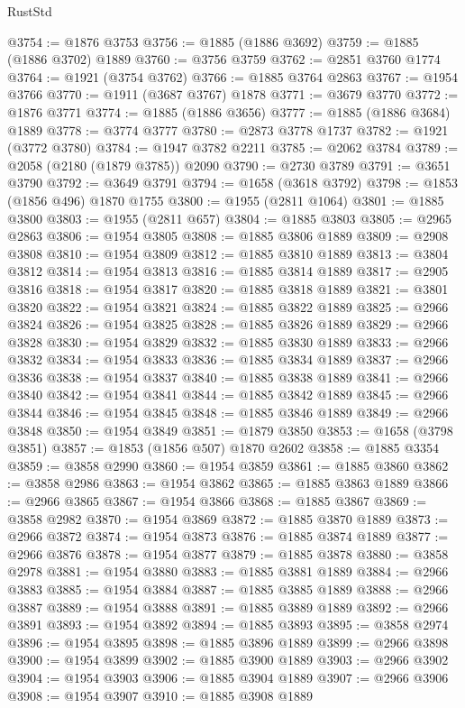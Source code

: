 \begin{lexlean}{RustStd}
\begin{coremodule}
@3754 := @1876 @3753
@3756 := @1885 (@1886 @3692)
@3759 := @1885 (@1886 @3702) @1889
@3760 := @3756 @3759
@3762 := @2851 @3760 @1774
@3764 := @1921 (@3754 @3762)
@3766 := @1885 @3764 @2863
@3767 := @1954 @3766
@3770 := @1911 (@3687 @3767) @1878
@3771 := @3679 @3770
@3772 := @1876 @3771
@3774 := @1885 (@1886 @3656)
@3777 := @1885 (@1886 @3684) @1889
@3778 := @3774 @3777
@3780 := @2873 @3778 @1737
@3782 := @1921 (@3772 @3780)
@3784 := @1947 @3782 @2211
@3785 := @2062 @3784
@3789 := @2058 (@2180 (@1879 @3785)) @2090
@3790 := @2730 @3789
@3791 := @3651 @3790
@3792 := @3649 @3791
@3794 := @1658 (@3618 @3792)
@3798 := @1853 (@1856 @496) @1870 @1755
@3800 := @1955 (@2811 @1064)
@3801 := @1885 @3800
@3803 := @1955 (@2811 @657)
@3804 := @1885 @3803
@3805 := @2965 @2863
@3806 := @1954 @3805
@3808 := @1885 @3806 @1889
@3809 := @2908 @3808
@3810 := @1954 @3809
@3812 := @1885 @3810 @1889
@3813 := @3804 @3812
@3814 := @1954 @3813
@3816 := @1885 @3814 @1889
@3817 := @2905 @3816
@3818 := @1954 @3817
@3820 := @1885 @3818 @1889
@3821 := @3801 @3820
@3822 := @1954 @3821
@3824 := @1885 @3822 @1889
@3825 := @2966 @3824
@3826 := @1954 @3825
@3828 := @1885 @3826 @1889
@3829 := @2966 @3828
@3830 := @1954 @3829
@3832 := @1885 @3830 @1889
@3833 := @2966 @3832
@3834 := @1954 @3833
@3836 := @1885 @3834 @1889
@3837 := @2966 @3836
@3838 := @1954 @3837
@3840 := @1885 @3838 @1889
@3841 := @2966 @3840
@3842 := @1954 @3841
@3844 := @1885 @3842 @1889
@3845 := @2966 @3844
@3846 := @1954 @3845
@3848 := @1885 @3846 @1889
@3849 := @2966 @3848
@3850 := @1954 @3849
@3851 := @1879 @3850
@3853 := @1658 (@3798 @3851)
@3857 := @1853 (@1856 @507) @1870 @2602
@3858 := @1885 @3354
@3859 := @3858 @2990
@3860 := @1954 @3859
@3861 := @1885 @3860
@3862 := @3858 @2986
@3863 := @1954 @3862
@3865 := @1885 @3863 @1889
@3866 := @2966 @3865
@3867 := @1954 @3866
@3868 := @1885 @3867
@3869 := @3858 @2982
@3870 := @1954 @3869
@3872 := @1885 @3870 @1889
@3873 := @2966 @3872
@3874 := @1954 @3873
@3876 := @1885 @3874 @1889
@3877 := @2966 @3876
@3878 := @1954 @3877
@3879 := @1885 @3878
@3880 := @3858 @2978
@3881 := @1954 @3880
@3883 := @1885 @3881 @1889
@3884 := @2966 @3883
@3885 := @1954 @3884
@3887 := @1885 @3885 @1889
@3888 := @2966 @3887
@3889 := @1954 @3888
@3891 := @1885 @3889 @1889
@3892 := @2966 @3891
@3893 := @1954 @3892
@3894 := @1885 @3893
@3895 := @3858 @2974
@3896 := @1954 @3895
@3898 := @1885 @3896 @1889
@3899 := @2966 @3898
@3900 := @1954 @3899
@3902 := @1885 @3900 @1889
@3903 := @2966 @3902
@3904 := @1954 @3903
@3906 := @1885 @3904 @1889
@3907 := @2966 @3906
@3908 := @1954 @3907
@3910 := @1885 @3908 @1889

\end{coremodule}
\end{lexlean}
